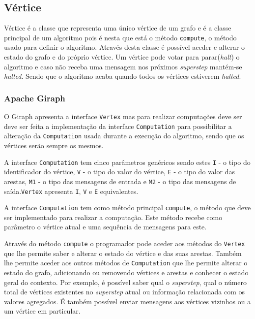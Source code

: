 \newpage
\subsection{Vértice}
\label{ss:vert}
Vértice é a classe que representa uma único vértice de um grafo e é a classe principal de um algoritmo pois é nesta que está o método \texttt{compute}, o método usado para definir o algoritmo. Através desta classe é possível aceder e alterar o estado do grafo e do próprio vértice. Um vértice pode votar para parar(\textit{halt}) o algoritmo e caso não receba uma mensagem nos próximos \textit{superstep} mantém-se \textit{halted}. Sendo que o algoritmo acaba quando todos os vértices estiverem \textit{halted}.
\subsubsection*{Apache Giraph}


O Giraph apresenta a interface \texttt{Vertex} mas para realizar computações deve ser deve ser feita a implementação da interface \texttt{Computation} para possibilitar a alteração da \texttt{Computation} usada durante a execução do algoritmo, sendo que os vértices serão sempre os mesmos.

A interface \texttt{Computation} tem cinco parâmetros genéricos sendo estes \texttt{I} - o tipo do identificador do vértice, \texttt{V} - o tipo do valor do vértice, \texttt{E} - o tipo do valor das arestas, \texttt{M1} - o tipo das mensagens de entrada e \texttt{M2} - o tipo das mensagens de saída.\texttt{Vertex} apresenta \texttt{I}, \texttt{V} e \texttt{E} equivalentes.

A interface \texttt{Computation} tem como método principal \texttt{compute}, o método que deve ser implementado para realizar a computação. Este método recebe como parâmetro o vértice atual e uma sequência de mensagens para este.

Através do método \texttt{compute} o programador pode aceder aos métodos do \texttt{Vertex} que lhe permite saber e alterar o estado do vértice e das suas arestas. Também lhe permite aceder aos outros métodos de \texttt{Computation} que lhe permite alterar o estado do grafo, adicionando ou removendo vértices e arestas e conhecer o estado geral do contexto. Por exemplo, é possível saber qual o \textit{superstep}, qual o número total de vértices existentes no \textit{superstep} atual ou informação relacionada com os valores agregados. É também possível enviar mensagens aos vértices vizinhos ou a um vértice em particular.

